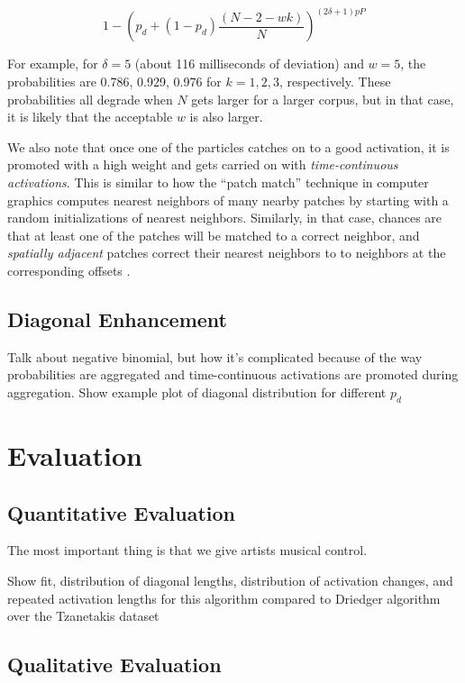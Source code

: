 \documentclass{article}
\begin{document}
\begin{equation}
    \label{eq:timeadjacentprobmodified}
    1 - \left( p_d + (1-p_d) \frac{(N-2-wk)}{N} \right)^{(2 \delta +1)pP}
\end{equation}

For example, for $\delta=5$ (about 116 milliseconds of deviation) and $w = 5$, the probabilities are 0.786, 0.929, 0.976 for $k=1, 2, 3$, respectively.  These probabilities all degrade when $N$ gets larger for a larger corpus, but in that case, it is likely that the acceptable $w$ is also larger.

We also note that once one of the particles catches on to a good activation, it is promoted with a high weight and gets carried on with {\em time-continuous activations}.  This is similar to how the ``patch match'' technique in computer graphics \cite{Barnes:2009:PAR, Barnes:2010:TGP} computes nearest neighbors of many nearby patches by starting with a random initializations of nearest neighbors.  Similarly, in that case, chances are that at least one of the patches will be matched to a correct neighbor, and {\em spatially adjacent} patches correct their nearest neighbors to to neighbors at the corresponding offsets \cite{Barnes:2009:PAR}.

\subsection{Diagonal Enhancement}

Talk about negative binomial, but how it's complicated because of the way probabilities are aggregated and time-continuous activations are promoted during aggregation.  Show example plot of diagonal distribution for different $p_d$


\section{Evaluation}

\subsection{Quantitative Evaluation}
The most important thing is that we give artists musical control.

Show fit, distribution of diagonal lengths, distribution of activation changes, and repeated activation lengths for this algorithm compared to Driedger algorithm over the Tzanetakis dataset


\subsection{Qualitative Evaluation}
\end{document}
